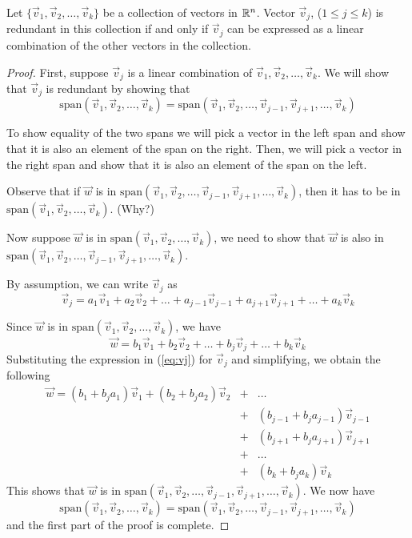 \documentclass{ximera}
\begin{document}
 \begin{theorem}\label{th:redundant}
     Let $\{\vec{v}_1,\vec{v}_2,\dots,\vec{v}_k\}$ be a collection of vectors in $\mathbb{R}^n$.  Vector $\vec{v}_j$, ($1\leq j\leq k$) is redundant in this collection if and only if $\vec{v}_j$ can be expressed as a linear combination of the other vectors in the collection.
 \end{theorem}
 \begin{proof}
     First, suppose $\vec{v}_j$ is a linear combination of $\vec{v}_1,\vec{v}_2,\dots,\vec{v}_k$.  We will show that $\vec{v}_j$ is redundant by showing that $$\mbox{span}\left(\vec{v}_1,\vec{v}_2,\dots,\vec{v}_k\right)=\mbox{span}\left(\vec{v}_1,\vec{v}_2,\dots,\vec{v}_{j-1},\vec{v}_{j+1},\dots,\vec{v}_k\right)$$

To show equality of the two spans we will pick a vector in the left span and show that it is also an element of the span on the right.  Then, we will pick a vector in the right span and show that it is also an element of the span on the left.

Observe that if $\vec{w}$ is in $\mbox{span}\left(\vec{v}_1,\vec{v}_2,\dots,\vec{v}_{j-1},\vec{v}_{j+1},\dots,\vec{v}_k\right)$, then it has to be in $\mbox{span}\left(\vec{v}_1,\vec{v}_2,\dots,\vec{v}_k\right)$. (Why?)

Now suppose $\vec{w}$ is in $\mbox{span}\left(\vec{v}_1,\vec{v}_2,\dots,\vec{v}_k\right)$, we need to show that $\vec{w}$ is also in $\mbox{span}\left(\vec{v}_1,\vec{v}_2,\dots,\vec{v}_{j-1},\vec{v}_{j+1},\dots,\vec{v}_k\right)$.

     By assumption, we can write $\vec{v}_j$ as
\begin{equation}\label{eq:vj}
\vec{v}_j=a_1\vec{v}_1+a_2\vec{v}_2+\dots +a_{j-1}\vec{v}_{j-1}+a_{j+1}\vec{v}_{j+1}+\dots +a_k\vec{v}_k
\end{equation}

Since $\vec{w}$ is in $\mbox{span}\left(\vec{v}_1,\vec{v}_2,\dots,\vec{v}_k\right)$, we have
$$\vec{w}=b_1\vec{v}_1+b_2\vec{v}_2+\dots +b_j\vec{v}_j+\dots +b_k\vec{v}_k$$
Substituting the expression in (\ref{eq:vj}) for $\vec{v}_j$ and simplifying, we obtain the following
\begin{eqnarray*}\vec{w}=(b_1+b_ja_1)\vec{v}_1+(b_2+b_ja_2)\vec{v}_2&+&\dots\\
&+&(b_{j-1}+b_ja_{j-1})\vec{v}_{j-1}\\
&+&(b_{j+1}+b_ja_{j+1})\vec{v}_{j+1}\\
&+&\dots\\
&+&(b_k+b_ja_k)\vec{v}_k\end{eqnarray*}
This shows that $\vec{w}$ is in $\mbox{span}\left(\vec{v}_1,\vec{v}_2,\dots,\vec{v}_{j-1},\vec{v}_{j+1},\dots,\vec{v}_k\right)$.
We now have 
$$\mbox{span}\left(\vec{v}_1,\vec{v}_2,\dots,\vec{v}_k\right)=\mbox{span}\left(\vec{v}_1,\vec{v}_2,\dots,\vec{v}_{j-1},\vec{v}_{j+1},\dots,\vec{v}_k\right)$$
and the first part of the proof is complete.


\end{proof}
\end{document}
